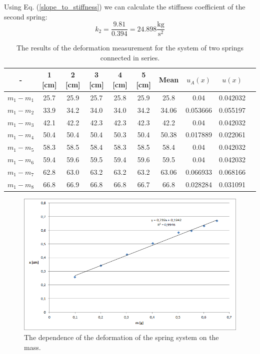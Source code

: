 \documentclass[a4paper,12pt,titlepage,bibliography=numbered]{article}
\begin{document}
Using Eq. (\ref{slope_to_stiffness}) we can calculate the stiffness coefficient of the second spring: \\
\begin{equation}
    k_2 = \frac{9.81}{0.394} = 24.898 \mathrm{\frac{kg}{s^2}}
\end{equation}

\begin{table}[H]
\centering
\caption{The results of the deformation measurement for the system of two springs connected in series.}
\begin{tabular}{|c|c|c|c|c|c|c|c|c|c|}
\hline
\textbf{-} & \textbf{1 [cm]} & \textbf{2 [cm]} & \textbf{3 [cm]} & \textbf{4 [cm]} & \textbf{5 [cm]} & \textbf{Mean} & \textbf{$u_A(x)$} & \textbf{$u(x)$} \\ 
\hline
$m_1 - m_1$ & 25.7 & 25.9 & 25.7 & 25.8 & 25.9 & 25.8 & 0.04 & 0.042032 \\ 
\hline
$m_1 - m_2$ & 33.9 & 34.2 & 34.0 & 34.0 & 34.2 & 34.06 & 0.053666 & 0.055197 \\ 
\hline
$m_1 - m_3$ & 42.1 & 42.2 & 42.3 & 42.3 & 42.3 & 42.2 & 0.04 & 0.042032 \\ 
\hline
$m_1 - m_4$ & 50.4 & 50.4 & 50.4 & 50.3 & 50.4 & 50.38 & 0.017889 & 0.022061 \\ 
\hline
$m_1 - m_5$ & 58.3 & 58.5 & 58.4 & 58.3 & 58.5 & 58.4 & 0.04 & 0.042032 \\ 
\hline
$m_1 - m_6$ & 59.4 & 59.6 & 59.5 & 59.4 & 59.6 & 59.5 & 0.04 & 0.042032 \\ 
\hline
$m_1 - m_7$ & 62.8 & 63.0 & 63.2 & 63.2 & 63.2 & 63.06 & 0.066933 & 0.068166 \\ 
\hline
$m_1 - m_8$ & 66.8 & 66.9 & 66.8 & 66.8 & 66.7 & 66.8 & 0.028284 & 0.031091 \\ 
\hline
\end{tabular}
\end{table}
\begin{figure}[H]
\centering
\includegraphics[width=1\textwidth]{fig3.png}
\caption{The dependence of the deformation of the spring system on the mass.}
\label{fig_3}
\end{figure}
\end{document}
